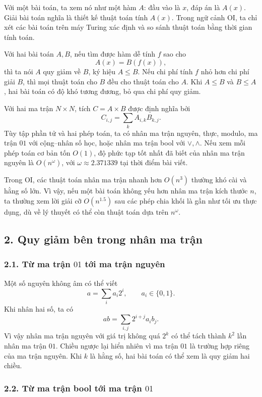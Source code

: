 \documentclass[11pt]{article}
\begin{document}
Với một bài toán, ta xem nó như một hàm \(A\): đầu vào là \(x\), đáp án là
\(A(x)\). Giải bài toán nghĩa là thiết kế thuật toán tính \(A(x)\). Trong ngữ
cảnh OI, ta chỉ xét các bài toán trên máy Turing xác định và so sánh thuật
toán bằng thời gian tính toán.

Với hai bài toán \(A,B\), nếu tìm được hàm dễ tính \(f\) sao cho
\[
  A(x)=B(f(x)),
\]
thì ta nói \(A\) quy giảm về \(B\), ký hiệu \(A\le B\). Nếu chi phí tính \(f\)
nhỏ hơn chi phí giải \(B\), thì mọi thuật toán cho \(B\) đều cho thuật toán cho
\(A\). Khi \(A\le B\) và \(B\le A\), hai bài toán có độ khó tương đương, bỏ qua
chi phí quy giảm.

Với hai ma trận \(N\times N\), tích \(C=A\times B\) được định nghĩa bởi
\[
  C_{i,j}=\sum_k A_{i,k}B_{k,j}.
\]
Tùy tập phần tử và hai phép toán, ta có nhân ma trận nguyên, thực, modulo, ma
trận \(01\) với cộng--nhân số học, hoặc nhân ma trận bool với \(\lor,\land\).
Nếu xem mỗi phép toán cơ bản tốn \(O(1)\), độ phức tạp tốt nhất đã biết của
nhân ma trận nguyên là \(O(n^\omega)\), với \(\omega\approx 2.371339\) tại thời
điểm bài viết.

Trong OI, các thuật toán nhân ma trận nhanh hơn \(O(n^3)\) thường khó cài và
hằng số lớn. Vì vậy, nếu một bài toán không yếu hơn nhân ma trận kích thước
\(n\), ta thường xem lời giải cỡ \(O(n^{1.5})\) sau các phép chia khối là gần
như tối ưu thực dụng, dù về lý thuyết có thể còn thuật toán dựa trên
\(n^\omega\).

\subsection*{2. Quy giảm bên trong nhân ma trận}

\subsubsection*{2.1. Từ ma trận \(01\) tới ma trận nguyên}

Một số nguyên không âm có thể viết
\[
  a=\sum_i a_i2^i,\qquad a_i\in\{0,1\}.
\]
Khi nhân hai số, ta có
\[
  ab=\sum_{i,j}2^{i+j}a_i b_j.
\]
Vì vậy nhân ma trận nguyên với giá trị không quá \(2^k\) có thể tách thành
\(k^2\) lần nhân ma trận \(01\). Chiều ngược lại hiển nhiên vì ma trận \(01\)
là trường hợp riêng của ma trận nguyên. Khi \(k\) là hằng số, hai bài toán có
thể xem là quy giảm hai chiều.

\subsubsection*{2.2. Từ ma trận bool tới ma trận \(01\)}
\end{document}

